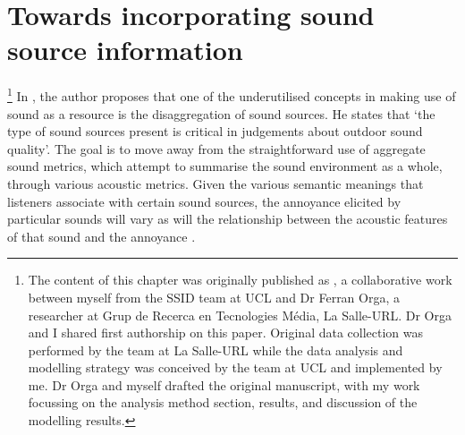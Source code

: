 \chapter{Towards incorporating sound source information}
\label{ch:mlmann}



\footnote{The content of this chapter was originally published as \citet{Orga2021Multilevel}, a collaborative work between myself from the SSID team at UCL and Dr Ferran Orga, a researcher at Grup de Recerca en Tecnologies M{\'e}dia, La Salle-URL. Dr Orga and I shared first authorship on this paper. Original data collection was performed by the team at La Salle-URL while the data analysis and modelling strategy was conceived by the team at UCL and implemented by me. Dr Orga and myself drafted the original manuscript, with my work focussing on the analysis method section, results, and discussion of the modelling results.} In \citet{Brown2009acoustic}, the author proposes that one of the underutilised concepts in making use of sound as a resource is the disaggregation of sound sources. He states that `the type of sound sources present is critical in judgements about outdoor sound quality'. The goal is to move away from the straightforward use of aggregate sound metrics, which attempt to summarise the sound environment as a whole, through various acoustic metrics. Given the various semantic meanings that listeners associate with certain sound sources, the annoyance elicited by particular sounds will vary as will the relationship between the acoustic features of that sound and the annoyance \citep{LafayInvestigating}.

